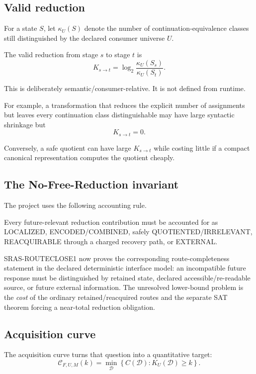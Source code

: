 \documentclass[11pt]{article}
\theoremstyle{plain}
\theoremstyle{definition}
\theoremstyle{remark}
\begin{document}
\subsection{Valid reduction}

For a state $S$, let $\kappa_U(S)$ denote the number of continuation-equivalence
classes still distinguished by the declared consumer universe $U$.

The valid reduction from stage $s$ to stage $t$ is
\[
\boxed{
K_{s\to t}
=
\log_2
\frac{\kappa_U(S_s)}{\kappa_U(S_t)}.
}
\]

This is deliberately semantic/consumer-relative. It is not defined from
runtime.

For example, a transformation that reduces the explicit number of assignments
but leaves every continuation class distinguishable may have large syntactic
shrinkage but
\[
K_{s\to t}=0.
\]

Conversely, a safe quotient can have large $K_{s\to t}$ while costing little
if a compact canonical representation computes the quotient cheaply.

\subsection{The No-Free-Reduction invariant}

The project uses the following accounting rule.

\begin{candidatebox}
Every future-relevant reduction contribution must be accounted for as
LOCALIZED, ENCODED/COMBINED, safely QUOTIENTED/IRRELEVANT, REACQUIRABLE through
a charged recovery path, or EXTERNAL.
\end{candidatebox}

SRAS-ROUTECLOSE1 now proves the corresponding route-completeness statement in
the declared deterministic interface model: an incompatible future response
must be distinguished by retained state, declared accessible/re-readable
source, or future external information. The unresolved lower-bound problem is
the \emph{cost} of the ordinary retained/reacquired routes and the separate SAT
theorem forcing a near-total reduction obligation.

\subsection{Acquisition curve}

The acquisition curve turns that question into a quantitative target:
\[
\boxed{
\mathcal C_{F,U,M}(k)
=
\min_{\mathcal D}
\left\{
C(\mathcal D):
K_U(\mathcal D)\ge k
\right\}.
}
\]
\end{document}
